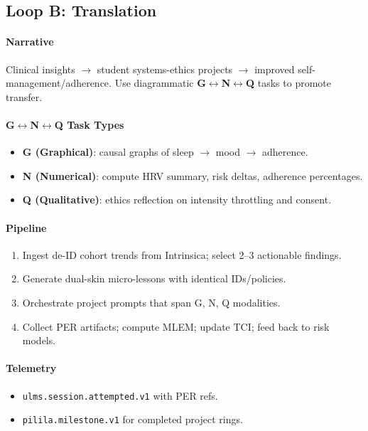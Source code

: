 \documentclass[11pt]{article}
\theoremstyle{plain}
\begin{document}
\bigskip
\subsection{Loop B: Translation}\label{sec:loop-translation}

\paragraph{Narrative}
Clinical insights $\rightarrow$ student systems-ethics projects $\rightarrow$ improved self-management/adherence. Use diagrammatic \textbf{G$\leftrightarrow$N$\leftrightarrow$Q} tasks to promote transfer.

\paragraph{G$\leftrightarrow$N$\leftrightarrow$Q Task Types}
\begin{itemize}
  \item \textbf{G (Graphical)}: causal graphs of sleep $\rightarrow$ mood $\rightarrow$ adherence.
  \item \textbf{N (Numerical)}: compute HRV summary, risk deltas, adherence percentages.
  \item \textbf{Q (Qualitative)}: ethics reflection on intensity throttling and consent.
\end{itemize}

\paragraph{Pipeline}
\begin{enumerate}
  \item Ingest de-ID cohort trends from Intrinsica; select 2--3 actionable findings.
  \item Generate dual-skin micro-lessons with identical IDs/policies.
  \item Orchestrate project prompts that span G, N, Q modalities.
  \item Collect PER artifacts; compute MLEM; update TCI; feed back to risk models.
\end{enumerate}

\paragraph{Telemetry}
\begin{itemize}
  \item \texttt{ulms.session.attempted.v1} with PER refs.
  \item \texttt{pilila.milestone.v1} for completed project rings.
\end{itemize}
\end{document}

